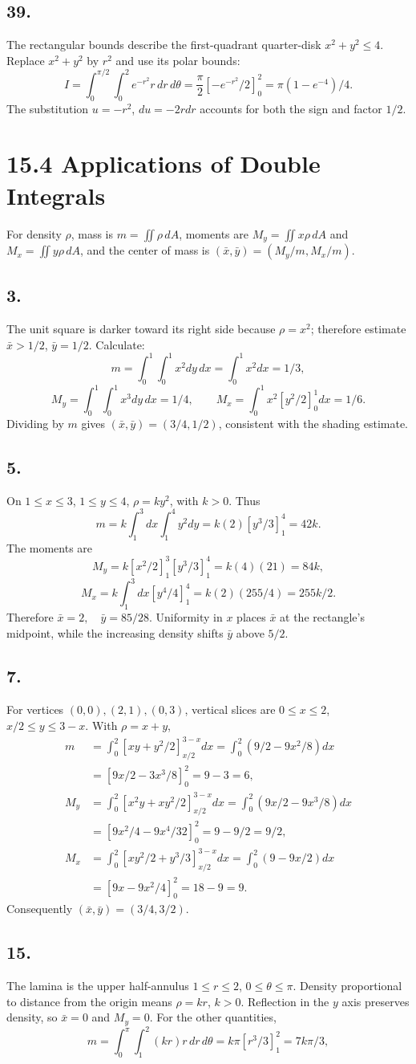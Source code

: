 \documentclass[11pt]{article}
\newcommand{\ex}[1]{\subsection*{#1.}}
\newcommand{\ans}[1]{\boxed{#1}}
\begin{document}
\ex{39}
The rectangular bounds describe the first-quadrant quarter-disk $x^2+y^2\le4$. Replace $x^2+y^2$ by $r^2$ and use its polar bounds:
\[I=\int_0^{\pi/2}\int_0^2e^{-r^2}r\,dr\,d\theta
=\frac\pi2[-e^{-r^2}/2]_0^2=\ans{\pi(1-e^{-4})/4}.\]
The substitution $u=-r^2$, $du=-2rdr$ accounts for both the sign and factor $1/2$.
\clearpage\section*{15.4 Applications of Double Integrals}
\noindent For density $\rho$, mass is $m=\iint\rho\,dA$, moments are $M_y=\iint x\rho\,dA$ and $M_x=\iint y\rho\,dA$, and the center of mass is $(\bar x,\bar y)=(M_y/m,M_x/m)$.
\ex{3}
The unit square is darker toward its right side because $\rho=x^2$; therefore estimate $\bar x>1/2$, $\bar y=1/2$. Calculate:
\[m=\int_0^1\int_0^1x^2dy\,dx=\int_0^1x^2dx=1/3,\]
\[M_y=\int_0^1\int_0^1x^3dy\,dx=1/4,\qquad
M_x=\int_0^1x^2[y^2/2]_0^1dx=1/6.\]
Dividing by $m$ gives $\ans{(\bar x,\bar y)=(3/4,1/2)}$, consistent with the shading estimate.
\ex{5}
On $1\le x\le3$, $1\le y\le4$, $\rho=ky^2$, with $k>0$. Thus
\[m=k\int_1^3dx\int_1^4y^2dy=k(2)[y^3/3]_1^4=\ans{42k}.\]
The moments are
\[M_y=k[x^2/2]_1^3[y^3/3]_1^4=k(4)(21)=84k,\]
\[M_x=k\int_1^3dx[y^4/4]_1^4=k(2)(255/4)=255k/2.\]
Therefore $\ans{\bar x=2,\quad\bar y=85/28}$. Uniformity in $x$ places $\bar x$ at the rectangle's midpoint, while the increasing density shifts $\bar y$ above $5/2$.
\ex{7}
For vertices $(0,0),(2,1),(0,3)$, vertical slices are $0\le x\le2$, $x/2\le y\le3-x$. With $\rho=x+y$,
\begin{align*}
m&=\int_0^2[xy+y^2/2]_{x/2}^{3-x}dx
=\int_0^2(9/2-9x^2/8)dx\\
&=[9x/2-3x^3/8]_0^2=9-3=\ans{6},\\
M_y&=\int_0^2[x^2y+xy^2/2]_{x/2}^{3-x}dx
=\int_0^2(9x/2-9x^3/8)dx\\
&=[9x^2/4-9x^4/32]_0^2=9-9/2=9/2,\\
M_x&=\int_0^2[xy^2/2+y^3/3]_{x/2}^{3-x}dx
=\int_0^2(9-9x/2)dx\\
&=[9x-9x^2/4]_0^2=18-9=9.
\end{align*}
Consequently $\ans{(\bar x,\bar y)=(3/4,3/2)}$.
\ex{15}
The lamina is the upper half-annulus $1\le r\le2$, $0\le\theta\le\pi$. Density proportional to distance from the origin means $\rho=kr$, $k>0$. Reflection in the $y$ axis preserves density, so $\bar x=0$ and $M_y=0$. For the other quantities,
\[m=\int_0^\pi\int_1^2(kr)r\,dr\,d\theta
=k\pi[r^3/3]_1^2=7k\pi/3,\]
\end{document}
